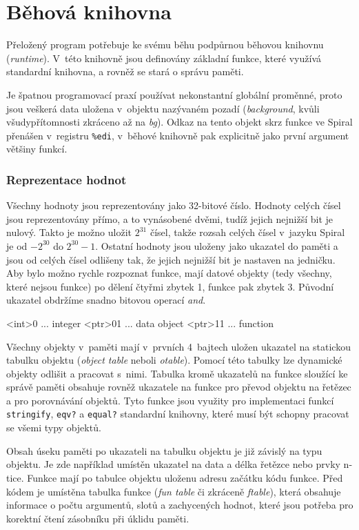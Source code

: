 \chapter{Běhová knihovna}

Přeložený program potřebuje ke svému běhu podpůrnou běhovou knihovnu
(\emph{runtime}). V~této knihovně jsou definovány základní funkce, které využívá
standardní knihovna, a rovněž se stará o správu paměti.

Je špatnou programovací praxí používat nekonstantní globální proměnné, proto
jsou veškerá  data uložena v~objektu nazývaném pozadí
(\emph{background}, kvůli všudypřítomnosti zkráceno až na \emph{bg}). Odkaz na
tento objekt skrz funkce ve Spiral přenášen v~registru \texttt{\%edi}, v~běhové
knihovně pak explicitně jako první argument většiny funkcí.

\subsection{Reprezentace hodnot}

Všechny hodnoty jsou reprezentovány jako 32-bitové číslo. Hodnoty celých čísel
jsou reprezentovány přímo, a to vynásobené dvěmi, tudíž jejich nejnižší bit je
nulový. Takto je možno uložit $2^{31}$ čísel, takže rozsah celých čísel v~jazyku
Spiral je od $-2^{30}$ do $2^{30}-1$. Ostatní hodnoty jsou uloženy jako ukazatel
do paměti a jsou od celých čísel odlišeny tak, že jejich nejnižší bit je
nastaven na jedničku. Aby bylo možno rychle rozpoznat funkce, mají datové
objekty (tedy všechny, které nejsou funkce) po dělení čtyřmi zbytek 1, funkce
pak zbytek 3.  Původní ukazatel obdržíme snadno bitovou operací \emph{and}.

\begin{ttcode}
   <int>0 ... integer
  <ptr>01 ... data object
  <ptr>11 ... function
\end{ttcode}

Všechny objekty v~paměti mají v~prvních 4~bajtech uložen ukazatel na statickou
tabulku objektu (\emph{object table} neboli \emph{otable}). Pomocí této tabulky
lze dynamické objekty odlišit a pracovat s~nimi. Tabulka kromě ukazatelů na
funkce sloužící ke správě paměti obsahuje rovněž ukazatele na funkce pro převod
objektu na řetězec a pro porovnávání objektů. Tyto funkce jsou využity pro
implementaci funkcí \texttt{stringify}, \texttt{eqv?} a \texttt{equal?}
standardní knihovny, které musí být schopny pracovat se všemi typy objektů.

Obsah úseku paměti po ukazateli na tabulku objektu je již závislý na typu
objektu. Je zde například umístěn ukazatel na data a délka řetězce nebo prvky
n-tice. Funkce mají po tabulce objektu uloženu adresu začátku kódu funkce. Před
kódem je umístěna tabulka funkce (\emph{fun table} či zkráceně \emph{ftable}),
která obsahuje informace o počtu argumentů, slotů a zachycených hodnot, které
jsou potřeba pro korektní čtení zásobníku při úklidu paměti.

